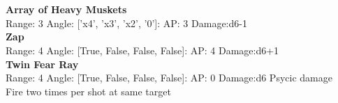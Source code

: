 \ \\

\ \\
{\bf Array of Heavy Muskets } \\



Range: 3  Angle: ['x4', 'x3', 'x2', '0']: AP: 3 Damage:d6-1 \\




{\bf Zap } \\



Range: 4  Angle: [True, False, False, False]: AP: 4 Damage:d6+1 \\




{\bf Twin Fear Ray } \\



Range: 4  Angle: [True, False, False, False]: AP: 0 Damage:d6 Psycic damage \\
Fire two times per shot at same target\\ 




 
\ \\



